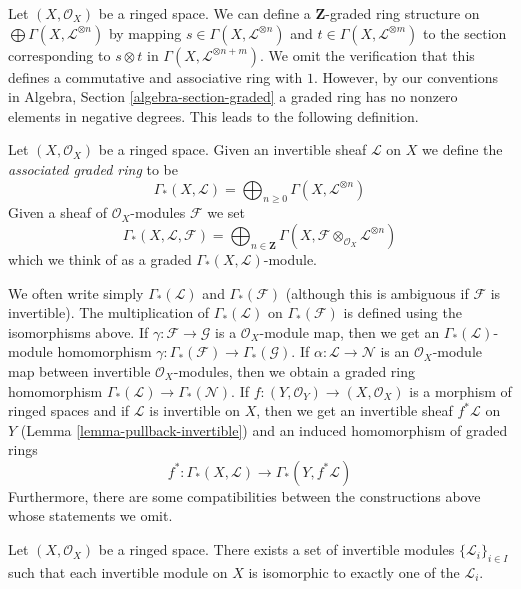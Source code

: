 \medskip\noindent
Let $(X, \mathcal{O}_X)$ be a ringed space. We can define a $\mathbf{Z}$-graded
ring structure on $\bigoplus \Gamma(X, \mathcal{L}^{\otimes n})$ by mapping
$s \in \Gamma(X, \mathcal{L}^{\otimes n})$ and
$t \in \Gamma(X, \mathcal{L}^{\otimes m})$ to the
section corresponding to $s \otimes t$ in
$\Gamma(X, \mathcal{L}^{\otimes n + m})$.
We omit the verification that this defines a commutative
and associative ring with $1$. However, by our conventions in
Algebra, Section \ref{algebra-section-graded}
a graded ring has no nonzero elements in negative degrees.
This leads to the following definition.

\begin{definition}
\label{definition-gamma-star}
Let $(X, \mathcal{O}_X)$ be a ringed space.
Given an invertible sheaf $\mathcal{L}$ on $X$ we define
the {\it associated graded ring} to be
$$
\Gamma_*(X, \mathcal{L})
=
\bigoplus\nolimits_{n \geq 0} \Gamma(X, \mathcal{L}^{\otimes n})
$$
Given a sheaf of $\mathcal{O}_X$-modules $\mathcal{F}$ we set
$$
\Gamma_*(X, \mathcal{L}, \mathcal{F})
=
\bigoplus\nolimits_{n \in \mathbf{Z}} \Gamma(X,
\mathcal{F} \otimes_{\mathcal{O}_X} \mathcal{L}^{\otimes n})
$$
which we think of as a graded $\Gamma_*(X, \mathcal{L})$-module.
\end{definition}

\noindent
We often write simply $\Gamma_*(\mathcal{L})$ and $\Gamma_*(\mathcal{F})$
(although this is ambiguous if $\mathcal{F}$ is invertible).
The multiplication of $\Gamma_*(\mathcal{L})$ on
$\Gamma_*(\mathcal{F})$ is defined using the isomorphisms
above. If $\gamma : \mathcal{F} \to \mathcal{G}$ is a $\mathcal{O}_X$-module
map, then we get an $\Gamma_*(\mathcal{L})$-module homomorphism
$\gamma : \Gamma_*(\mathcal{F}) \to \Gamma_*(\mathcal{G})$.
If $\alpha : \mathcal{L} \to \mathcal{N}$ is an $\mathcal{O}_X$-module
map between invertible $\mathcal{O}_X$-modules, then we obtain
a graded ring homomorphism $\Gamma_*(\mathcal{L}) \to \Gamma_*(\mathcal{N})$.
If $f : (Y, \mathcal{O}_Y) \to (X, \mathcal{O}_X)$
is a morphism of ringed spaces and if $\mathcal{L}$ is invertible
on $X$, then we get an invertible sheaf $f^*\mathcal{L}$ on $Y$
(Lemma \ref{lemma-pullback-invertible})
and an induced homomorphism of graded rings
$$
f^* :
\Gamma_*(X, \mathcal{L})
\longrightarrow
\Gamma_*(Y, f^*\mathcal{L})
$$
Furthermore, there are some compatibilities between the constructions
above whose statements we omit.

\begin{lemma}
\label{lemma-pic-set}
Let $(X, \mathcal{O}_X)$ be a ringed space.
There exists a set of invertible modules $\{\mathcal{L}_i\}_{i \in I}$
such that each invertible module on $X$ is isomorphic to exactly
one of the $\mathcal{L}_i$.
\end{lemma}

